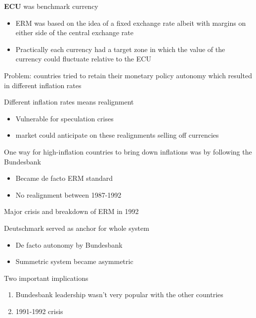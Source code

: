 \documentclass{beamer}
\begin{document}
\begin{frame}
  \textbf{ECU} was benchmark currency
  \begin{itemize}
    \item ERM was based on the idea of a fixed exchange rate albeit with margins on either side of the central exchange rate
    \item Practically each currency had a target zone in which the value of the currency could fluctuate relative to the ECU
  \end{itemize}
  \medskip
  Problem: countries tried to retain their monetary policy autonomy which resulted in different inflation rates
\end{frame}

\begin{frame}
  Different inflation rates means realignment
  \begin{itemize}
    \item Vulnerable for speculation crises
    \item market could anticipate on these realignments selling off currencies
  \end{itemize}
  \medskip
  One way for high-inflation countries to bring down inflations was by following the Bundesbank
  \begin{itemize}
    \item Became de facto ERM standard
    \item No realignment between 1987-1992
  \end{itemize}
  \medskip
 Major crisis and breakdown of ERM in 1992
\end{frame}


\begin{frame}
  Deutschmark served as anchor for whole system
  \begin{itemize}
    \item De facto autonomy by Bundesbank
    \item Summetric system became asymmetric
  \end{itemize}
  \medskip
  Two important implications 
\begin{enumerate}
  \item Bundesbank leadership wasn't very popular with the other countries
  \item 1991-1992 crisis
\end{enumerate}
\end{frame}
\end{document}
